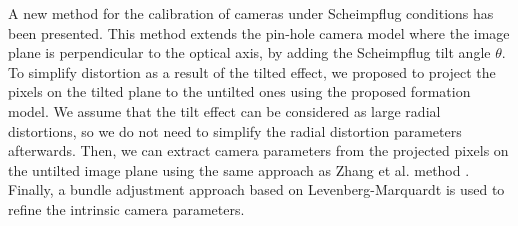 \documentclass[12pt]{article}
\begin{document}
A new method for the calibration of cameras under Scheimpflug conditions has been presented. This method extends the pin-hole camera model where the image plane is perpendicular to the optical axis, by adding the Scheimpflug tilt angle $\theta$. To simplify distortion as a result of the tilted effect, we proposed to project the pixels on the tilted plane to the untilted ones using the proposed formation model. We assume that the tilt effect can be considered as large radial distortions, so we do not need to simplify the radial distortion parameters afterwards.  Then, we can extract camera parameters from the projected pixels on the untilted image plane using the same approach as Zhang et al. method \cite{Zhang:2000:FN}. Finally, a bundle adjustment approach based on Levenberg-Marquardt  is used to refine the intrinsic camera parameters.


%

\end{document}

